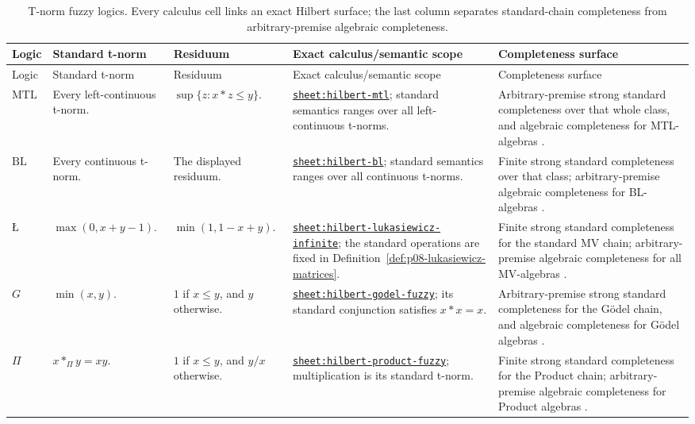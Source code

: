 \begin{landscape}
\begin{longtable}{@{}p{.10\linewidth}p{.18\linewidth}p{.20\linewidth}p{.20\linewidth}p{.23\linewidth}@{}}
\caption{T-norm fuzzy logics.  Every calculus cell links an exact Hilbert
surface; the last column separates standard-chain completeness from
arbitrary-premise algebraic completeness.}
\label{tab:p08-tnorm-logics}\\
\toprule
Logic & Standard t-norm & Residuum & Exact calculus/semantic scope & Completeness surface \\
\midrule
\endfirsthead
\toprule
Logic & Standard t-norm & Residuum & Exact calculus/semantic scope & Completeness surface \\
\midrule
\endhead
\(\mathrm{MTL}\) & Every left-continuous t-norm. &
\(\sup\{z:x\ast z\leq y\}\). &
\hyperref[sheet:hilbert-mtl]{\texttt{sheet:hilbert-mtl}}; standard semantics
ranges over all left-continuous t-norms. & Arbitrary-premise strong standard
completeness over that whole class, and algebraic completeness for MTL-algebras
\cite{EstevaGodo2001,JeneiMontagna2002}. \\
\addlinespace
\(\mathrm{BL}\) & Every continuous t-norm. & The displayed residuum. &
\hyperref[sheet:hilbert-bl]{\texttt{sheet:hilbert-bl}}; standard semantics
ranges over all continuous t-norms. & Finite strong standard completeness over
that class; arbitrary-premise algebraic completeness for BL-algebras
\cite{CignoliEstevaGodoTorrens2000}. \\
\addlinespace
\(\text{\L}\) & \(\max(0,x+y-1)\). &
\(\min(1,1-x+y)\). &
\hyperref[sheet:hilbert-lukasiewicz-infinite]{\texttt{sheet:hilbert-lukasiewicz-infinite}};
the standard operations are fixed in
Definition~\ref{def:p08-lukasiewicz-matrices}. & Finite strong standard
completeness for the standard MV chain; arbitrary-premise algebraic
completeness for all MV-algebras
\cite{Hajek1998,CignoliDOttavianoMundici2000}. \\
\addlinespace
\(G\) & \(\min(x,y)\). & \(1\) if \(x\leq y\), and
\(y\) otherwise. &
\hyperref[sheet:hilbert-godel-fuzzy]{\texttt{sheet:hilbert-godel-fuzzy}};
its standard conjunction satisfies \(x\ast x=x\). & Arbitrary-premise strong
standard completeness for the G\"odel chain, and algebraic completeness for
G\"odel algebras \cite{Hajek1998,CintulaHajekNoguera2011}. \\
\addlinespace
\(\Pi\) & \(x\mathbin{\ast_{\Pi}}y=xy\). & \(1\) if \(x\leq y\), and \(y/x\) otherwise.
& \hyperref[sheet:hilbert-product-fuzzy]{\texttt{sheet:hilbert-product-fuzzy}};
multiplication is its standard t-norm. & Finite strong standard completeness
for the Product chain; arbitrary-premise algebraic completeness for Product
algebras \cite{Hajek1998,CintulaHajekNoguera2011}. \\
\bottomrule
\end{longtable}
\end{landscape}

